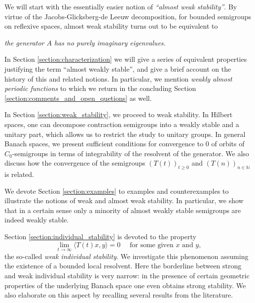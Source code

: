 \documentclass[11pt,intlimits, draft,oneside]{amsart}
\theoremstyle{definition}
\def\NN{\mathbb{N}}
\begin{document}
We will start with the essentially easier notion of
 \emph{``almost weak stability''}. By virtue of the
Jacobs-Glicksberg-de Leeuw decomposition, for bo\-unded semigroups
on reflexive spaces, almost weak stability turns out to be
equivalent to
\begin{center}\it
the generator $A$ has no purely imaginary eigenvalues.
\end{center}
 In Section
\ref{section:characterization} we will give a series of equivalent
properties justifying the term ``almost weakly stable'', and give a
brief account on the history of this and related notions. In
particular, we mention \emph{weakly almost periodic functions} to
which we return in the concluding Section
\ref{section:comments_and_open_quetions} as well.

\smallskip


In Section \ref{section:weak_stability}, we proceed to weak
stability. In Hilbert spaces, one can decompose contraction
semigroups into a weakly stable and a unitary part, which allows us
to restrict the study to unitary groups. In general Banach spaces,
we present sufficient conditions for convergence to $0$ of orbits of
$C_0$-semigroups in terms of integrability of the resolvent of the
generator. We also discuss how the convergence of the semigroups
$(T(t))_{t\geq 0}$ and $(T(n))_{n\in\NN}$ is related. 

\smallskip

We devote Section \ref{section:examples} to examples and
counterexamples to illustrate the notions of weak and almost weak
stability. In particular, we show that in a certain sense only a
minority of almost weakly stable semigroups are indeed weakly stable.

\smallskip


Section \ref{section:individual_stability} is devoted to the property 
\begin{equation*}
\lim_{t\to\infty} \langle T(t)x, y \rangle =0 \quad \text{ for some given  } x \text {  and } y, 
\end{equation*}
the so-called \emph{weak individual stability}. 
%
We investigate this phenomenon assuming the existence of
a bounded local resolvent. Here the borderline between strong and
weak individual stability is very narrow: in the presence of certain
geometric properties of the underlying Banach space one even obtains
strong stability. We also elaborate on this aspect by recalling
several results from the literature.
\end{document}
